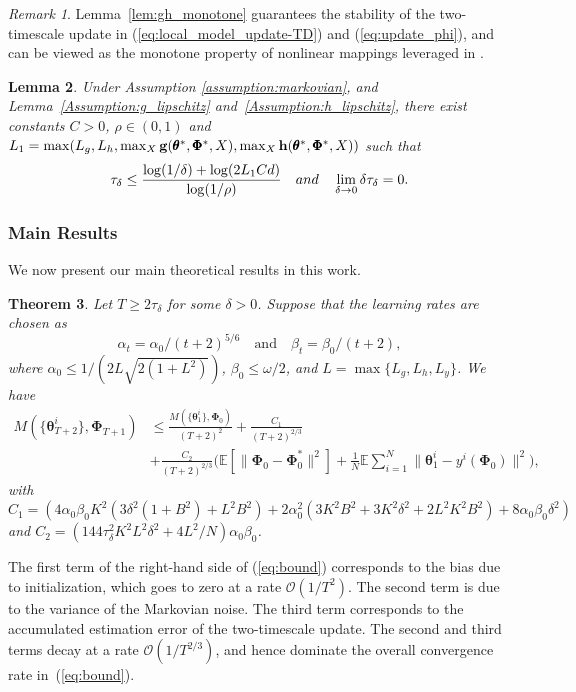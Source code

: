 \documentclass{article} %
\def\eqref#1{equation~\ref{#1}}
\theoremstyle{plain}
\newtheorem{theorem}{Theorem}[section]
\newtheorem{lemma}[theorem]{Lemma}
\theoremstyle{definition}
\theoremstyle{remark}
\newtheorem{remark}[theorem]{Remark}
\renewcommand{\eqref}[1]{(\ref{#1})}
\begin{document}
\begin{remark}
Lemma~\ref{lem:gh_monotone} guarantees the stability of the two-timescale update in \eqref{eq:local_model_update-TD} and \eqref{eq:update_phi}, and can be viewed as the monotone property of nonlinear mappings leveraged in \cite{doan2022nonlinear, chen2019performance}. 

\end{remark}




\begin{lemma}\label{lemma:mixing_time}
{Under Assumption \ref{assumption:markovian}, and Lemma~\ref{Assumption:g_lipschitz} and~\ref{Assumption:h_lipschitz},} there exist constants $C>0$, $\rho\in(0,1)$ and $L_1=\max(L_g, L_h, \max_X {\mathbf{g}}(\pmb{\theta}^*, \pmb{\Phi}^*, X), \max_X \mathbf{h}(\pmb{\theta}^*, \pmb{\Phi}^*, X))$ such that 
\[
\tau_\delta\leq \frac{\log(1/\delta)+\log(2L_1Cd)}{\log(1/\rho)} \quad \textnormal{and} \quad \lim_{\delta\rightarrow 0}\delta\tau_{\delta}=0.
\]

\end{lemma}



\subsubsection{Main Results}
We now present our main theoretical results in this work. 
\begin{theorem}\label{theorem:1}
Let $T\geq 2\tau_\delta$ for some $\delta > 0$. Suppose that the learning rates are chosen as
\[
\alpha_t=\alpha_0/(t+2)^{5/6} \quad \text{and} \quad \beta_t=\beta_0/(t+2), 
\]
where $\alpha_0\leq 1/(2L\sqrt{2(1+L^2)})$, $\beta_0\leq \omega/2$, and $L=\max\{L_g, L_h, L_y\}$.
We have
\begin{align}
    M(\{\pmb{\theta}_{T+2}^i\}, \pmb{\Phi}_{T+1}) &\leq \frac{M(\{\pmb{\theta}_{1}^i\}, \pmb{\Phi}_{0})}{(T+2)^2} + \frac{C_1}{(T+2)^{2/3}} \nonumber \\
    &+\frac{C_2}{(T+2)^{2/3}}\biggl(\mathbb{E}[\|\pmb{\Phi}_0-\pmb{\Phi}_0^*\|^2]+\frac{1}{N}\mathbb{E}\sum_{i=1}^N\|\pmb{\theta}^i_{1}-y^i(\pmb{\Phi}_0)\|^2\biggr),\label{eq:bound}
\end{align}
with $C_1=(4\alpha_0\beta_0K^2(3\delta^2(1+B^2)+L^2B^2)+2\alpha_{0}^2(3K^2B^2+3K^2\delta^2+2L^2K^2B^2)+8\alpha_{0}\beta_0\delta^2)$ and $C_2=(144\tau_{\delta}^2K^2L^2\delta^2+4L^2/N)\alpha_0\beta_0$.     
\end{theorem}The first term of the right-hand side of (\ref{eq:bound}) corresponds to the bias due to initialization, which goes to zero at a rate $\mathcal{O}(1\slash T^2)$. 
%
The second term is due to the variance of the Markovian noise. 
%
The third term corresponds to the accumulated estimation error of the two-timescale update.  
%
The second and third terms decay at a rate $\mathcal{O}(1\slash T^{2/3})$, and hence dominate the overall convergence rate in~(\ref{eq:bound}).
\end{document}
